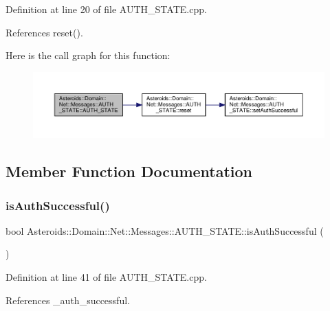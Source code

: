 Definition at line 20 of file A\+U\+T\+H\+\_\+\+S\+T\+A\+T\+E.\+cpp.



References reset().

Here is the call graph for this function\+:\nopagebreak
\begin{figure}[H]
\begin{center}
\leavevmode
\includegraphics[width=350pt]{classAsteroids_1_1Domain_1_1Net_1_1Messages_1_1AUTH__STATE_a6d14693ee76c4fc9940ab2d85a24af5f_cgraph}
\end{center}
\end{figure}


\subsection{Member Function Documentation}
\mbox{\label{classAsteroids_1_1Domain_1_1Net_1_1Messages_1_1AUTH__STATE_aeff14792e906f69aa717d94c552cf075}} 
\subsubsection{\texorpdfstring{is\+Auth\+Successful()}{isAuthSuccessful()}}
{\footnotesize\ttfamily bool Asteroids\+::\+Domain\+::\+Net\+::\+Messages\+::\+A\+U\+T\+H\+\_\+\+S\+T\+A\+T\+E\+::is\+Auth\+Successful (\begin{DoxyParamCaption}{ }\end{DoxyParamCaption})}



Definition at line 41 of file A\+U\+T\+H\+\_\+\+S\+T\+A\+T\+E.\+cpp.



References \+\_\+auth\+\_\+successful.

